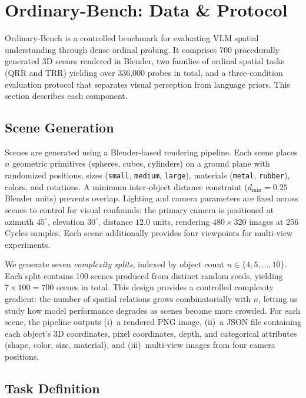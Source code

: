 
\section{Ordinary-Bench: Data \& Protocol}
\label{sec:benchmark}

Ordinary-Bench is a controlled benchmark for evaluating VLM spatial understanding through dense ordinal probing. It comprises 700 procedurally generated 3D scenes rendered in Blender, two families of ordinal spatial tasks (QRR and TRR) yielding over 336{,}000 probes in total, and a three-condition evaluation protocol that separates visual perception from language priors. This section describes each component.

\subsection{Scene Generation}
\label{sec:scene-gen}

Scenes are generated using a Blender-based rendering pipeline. Each scene places $n$ geometric primitives (spheres, cubes, cylinders) on a ground plane with randomized positions, sizes (\texttt{small}, \texttt{medium}, \texttt{large}), materials (\texttt{metal}, \texttt{rubber}), colors, and rotations. A minimum inter-object distance constraint ($d_{\min} = 0.25$ Blender units) prevents overlap. Lighting and camera parameters are fixed across scenes to control for visual confounds: the primary camera is positioned at azimuth $45^\circ$, elevation $30^\circ$, distance $12.0$ units, rendering $480 \times 320$ images at 256 Cycles samples. Each scene additionally provides four viewpoints for multi-view experiments.

We generate seven \emph{complexity splits}, indexed by object count $n \in \{4, 5, \ldots, 10\}$. Each split contains 100 scenes produced from distinct random seeds, yielding $7 \times 100 = 700$ scenes in total. This design provides a controlled complexity gradient: the number of spatial relations grows combinatorially with $n$, letting us study how model performance degrades as scenes become more crowded. For each scene, the pipeline outputs (i)~a rendered PNG image, (ii)~a JSON file containing each object's 3D coordinates, pixel coordinates, depth, and categorical attributes (shape, color, size, material), and (iii)~multi-view images from four camera positions.

\subsection{Task Definition}
\label{sec:tasks}

